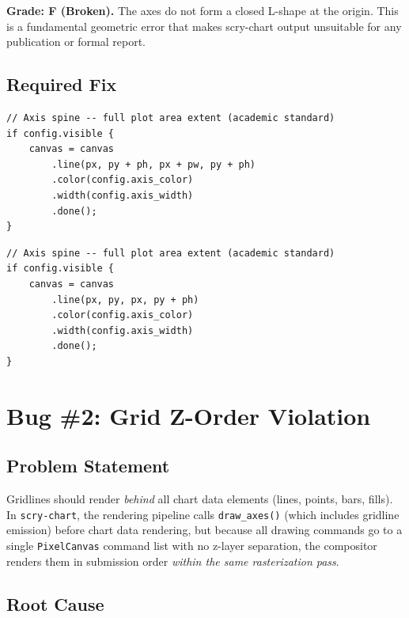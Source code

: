 \documentclass[11pt,a4paper]{article}
\begin{document}
\begin{criticalbox}
\textbf{Grade: F (Broken).} The axes do not form a closed L-shape at the
origin. This is a fundamental geometric error that makes scry-chart output
unsuitable for any publication or formal report.
\end{criticalbox}

\subsection{Required Fix}

\begin{lstlisting}[title={Corrected Bottom Spine (axis.rs)}]
// Axis spine -- full plot area extent (academic standard)
if config.visible {
    canvas = canvas
        .line(px, py + ph, px + pw, py + ph)
        .color(config.axis_color)
        .width(config.axis_width)
        .done();
}
\end{lstlisting}

\begin{lstlisting}[title={Corrected Left Spine (axis.rs)}]
// Axis spine -- full plot area extent (academic standard)
if config.visible {
    canvas = canvas
        .line(px, py, px, py + ph)
        .color(config.axis_color)
        .width(config.axis_width)
        .done();
}
\end{lstlisting}

\section{Bug \#2: Grid Z-Order Violation}
\label{sec:grid}

\subsection{Problem Statement}
Gridlines should render \emph{behind} all chart data elements (lines, points,
bars, fills). In \texttt{scry-chart}, the rendering pipeline calls
\texttt{draw\_axes()} (which includes gridline emission) before chart data
rendering, but because all drawing commands go to a single \texttt{PixelCanvas}
command list with no z-layer separation, the compositor renders them in
submission order \emph{within the same rasterization pass}.

\subsection{Root Cause}
\end{document}

